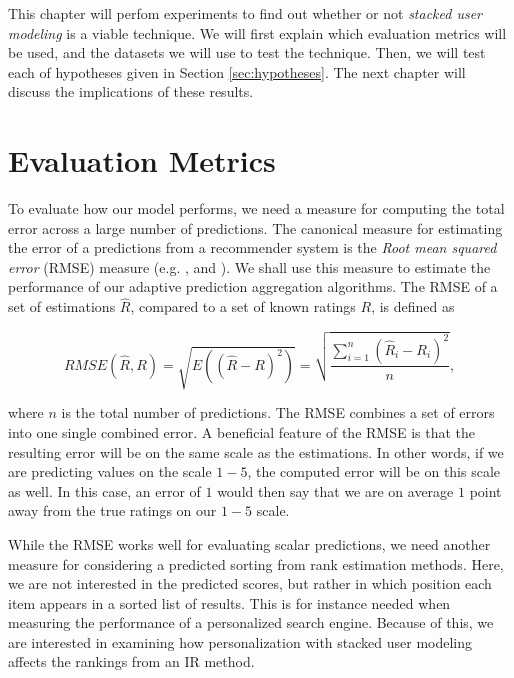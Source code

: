 \label{chap:results}

This chapter will perfom experiments to find out whether or not
\emph{stacked user modeling} is a viable technique.
We will first explain which evaluation metrics will be used,
and the datasets we will use to test the technique.
Then, we will test each of hypotheses given in Section \ref{sec:hypotheses}.
The next chapter will discuss the implications of these results.


\section{Evaluation Metrics}

To evaluate how our model performs, we need a measure
for computing the total error across a large number of predictions.
The canonical measure for estimating the error of a 
predictions from a recommender system
is the \emph{Root mean squared error} (RMSE) measure
(e.g. \citet[p17]{Herlocker2004}, \citet[p13]{Adomavicius2005} and \citet[p6]{Bell2007}).
We shall use this measure to estimate the performance
of our adaptive prediction aggregation algorithms.
The RMSE of a set of estimations $\hat{R}$, 
compared to a set of known ratings $R$, is defined as

\begin{equation*}
  RMSE(\hat{R},R) = \sqrt{E((\hat{R} - R)^2)}
  = \sqrt{\frac{
      \sum_{i=1}^{n} (\hat{R}_i - R_i)^2
    }{
      n
    }},
\end{equation*}

where $n$ is the total number of predictions.
The RMSE combines a set of errors into one single combined error.
A beneficial feature of the RMSE is that the resulting error 
will be on the same scale as the estimations. In other words,
if we are predicting values on the scale $1-5$, the computed error
will be on this scale as well. In this case, an error of $1$
would then say that we are on average $1$ point away from the true 
ratings on our $1-5$ scale.

While the RMSE works well for evaluating scalar predictions,
we need another measure for considering a predicted sorting 
from rank estimation methods.
Here, we are not interested in the predicted scores,
but rather in which position each item appears in a sorted list of results.
This is for instance needed when measuring the performance of a
personalized search engine.
Because of this, we are interested in examining how 
personalization with stacked user modeling affects the rankings
from an IR method.


